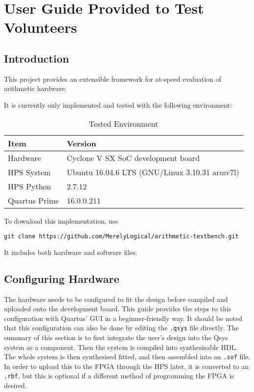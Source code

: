 \chapter{User Guide Provided to Test Volunteers}
\label{appendix:guide}

\section{Introduction}

This project provides an extensible framework for at-speed evaluation of arithmetic hardware.

It is currently only implemented and tested with the following environment:
\begin{table}[H]
  \centering
  \begin{tabular}{|l|l|}
    \hline
    Item          & Version \\
    \hline
    Hardware      & Cyclone V SX SoC development board \\
    HPS System    & Ubuntu 16.04.6 LTS (GNU/Linux 3.10.31 armv7l)\\
    HPS Python    & 2.7.12 \\
    Quartus Prime & 16.0.0.211 \\
    \hline
  \end{tabular}
  \caption{Tested Environment}
\end{table}

To download this implementation, use

\texttt{git clone https://github.com/MerelyLogical/arithmetic-testbench.git}

It includes both hardware and software files.

\section{Configuring Hardware}
The hardware needs to be configured to fit the design before compiled and uploaded onto the development board.
This guide provides the steps to this configuration with Quartus' GUI in a beginner-friendly way.
It should be noted that this configuration can also be done by editing the \texttt{.qsys} file directly.
The summary of this section is to first integrate the user's design into the Qsys system as a component.
Then the system is compiled into synthesisable HDL.
The whole system is then synthesised fitted, and then assembled into an \texttt{.sof} file.
In order to upload this to the FPGA through the HPS later, it is converted to an \texttt{.rbf}, but this is optional if a different method of programming the FPGA is desired.

